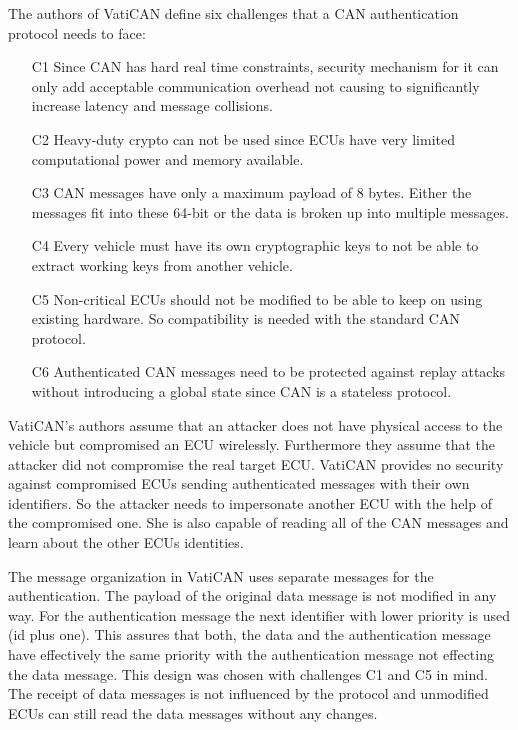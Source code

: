 The authors of VatiCAN define six challenges that a CAN authentication protocol
needs to face:

\begin{enumerate}
    \item[C1] Since CAN has hard real time constraints, security mechanism for
    it can only add acceptable communication overhead not causing to
    significantly increase latency and message collisions. 
    \item[C2] Heavy-duty crypto can not be used since ECUs have very limited
    computational power and memory available.
    \item[C3] CAN messages have only a maximum payload of 8 bytes. Either the
    messages fit into these 64-bit or the data is broken up into multiple
    messages.
    \item[C4] Every vehicle must have its own cryptographic keys to not be able
    to extract working keys from another vehicle.
    \item[C5] Non-critical ECUs should not be modified to be able to keep on
    using existing hardware. So compatibility is needed with the standard CAN
    protocol.
    \item[C6] Authenticated CAN messages need to be protected against replay
    attacks without introducing a global state since CAN is a stateless
    protocol.
\end{enumerate}

VatiCAN's authors assume that an attacker does not have physical access to the
vehicle but compromised an ECU wirelessly. Furthermore they assume that the
attacker did not compromise the real target ECU\@. VatiCAN provides no security
against compromised ECUs sending authenticated messages with their own
identifiers. So the attacker needs to impersonate another ECU with the help of
the compromised one. She is also capable of reading all of the CAN messages and
learn about the other ECUs identities.

The message organization in VatiCAN uses separate messages for the
authentication. The payload of the original data message is not modified in any
way. For the authentication message the next identifier with lower priority is
used (id plus one). This assures that both, the data and the authentication
message have effectively the same priority with the authentication message
not effecting the data message. This design was chosen with challenges C1 and C5
in mind. The receipt of data messages is not influenced by the protocol and
unmodified ECUs can still read the data messages without any changes.

